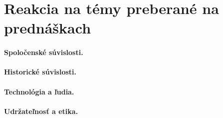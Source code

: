 \section{Reakcia na témy preberané na prednáškach} \label{reakcie_na_prednasky}

\paragraph{Spoločenské súvislosti.}

\paragraph{Historické súvislosti.}

\paragraph{Technológia a ľudia.}

\paragraph{Udržateľnosť a etika.}